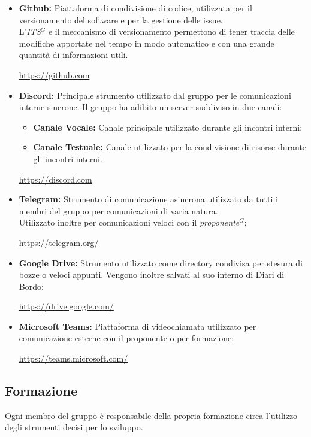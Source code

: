         \begin{itemize}
            \item \textbf{Github:} Piattaforma di condivisione di codice, utilizzata per il versionamento del software e per la gestione delle issue.\\
            L'\emph{ITS}$^{G}$ e il meccanismo di versionamento permettono di tener traccia delle modifiche apportate nel tempo in modo automatico e con una grande quantità di informazioni utili.
            \begin{center}
                \url{https://github.com}
            \end{center}
            \item \textbf{Discord:} Principale strumento utilizzato dal gruppo per le comunicazioni interne sincrone. Il gruppo ha adibito un server suddiviso in due canali:
                \begin{itemize}
                    \item \textbf{Canale Vocale:} Canale principale utilizzato durante gli incontri interni;
                    \item \textbf{Canale Testuale:} Canale utilizzato per la condivisione di risorse durante gli incontri interni.
                \end{itemize}
                \begin{center}
                    \url{https://discord.com}
                \end{center}
            \item \textbf{Telegram:} Strumento di comunicazione asincrona utilizzato da tutti i membri del gruppo per comunicazioni di varia natura.\\
                    Utilizzato inoltre per comunicazioni veloci con il \emph{proponente}$^{G}$;
                    \begin{center}
                        \url{https://telegram.org/}
                    \end{center}
            \item \textbf{Google Drive:} Strumento utilizzato come directory condivisa per stesura di bozze o veloci appunti. Vengono inoltre salvati al suo interno di Diari di Bordo:
                \begin{center}
                    \url{https://drive.google.com/}
                \end{center}
           \item \textbf{Microsoft Teams:} Piattaforma di videochiamata utilizzato per comunicazione esterne con il proponente o per formazione:
           \begin{center}
            \url{https://teams.microsoft.com/}
           \end{center}
        \end{itemize}

        \subsection{Formazione}

        Ogni membro del gruppo è responsabile della propria formazione circa l'utilizzo degli strumenti decisi per lo sviluppo.
